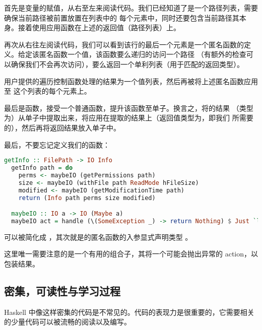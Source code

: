 \documentclass[./main.tex]{subfiles}
\begin{document}
首先是变量的赋值，从右至左来阅读代码。我们已经知道了是一个路径列表，需要确保当前路径被前置放置在列表中的
每个元素中，同时还要包含当前路径其本身。接着使用应用函数在上述的返回值（路径列表）上。

再次从右往左阅读代码，我们可以看到该行的最后一个元素是一个匿名函数的定义。给定该匿名函数一个值，该函数要么递归的访问一个路径
（有额外的检查可以确保我们不会再次访问），要么返回一个单利列表（用于匹配的返回类型）。

用户提供的遍历控制函数处理的结果为一个值列表，然后再被将上述匿名函数应用至
这个列表的每个元素上。

最后是函数，接受一个普通函数，提升该函数至单子。换言之，将的结果
（类型为）从单子中提取出来，将应用在提取的结果上（返回值类型为\acode{[Info]}，即我们
所需要的），然后再将返回结果放入单子中。

最后，不要忘记定义我们的函数：

\begin{lstlisting}[language=Haskell]
  getInfo :: FilePath -> IO Info
  getInfo path = do
    perms <- maybeIO (getPermissions path)
    size <- maybeIO (withFile path ReadMode hFileSize)
    modified <- maybeIO (getModificationTime path)
    return (Info path perms size modified)

  maybeIO :: IO a -> IO (Maybe a)
  maybeIO act = handle (\(SomeException _) -> return Nothing) $ Just `liftM` act
\end{lstlisting}

可以被简化成
，其次就是的匿名函数的入参显式声明类型
。

这里唯一需要注意的是一个有用的组合子，其将一个可能会抛出异常的 action，以包装结果。

\subsection*{密集，可读性与学习过程}

Haskell 中像这样密集的代码是不常见的。代码的表现力是很重要的，它需要相关的少量代码可以被流畅的阅读以及编写。
\end{document}
